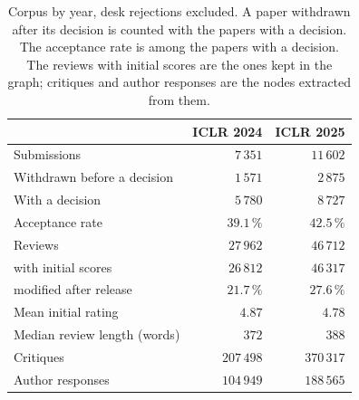 \begin{table}[t]
\centering
\small
\setlength{\tabcolsep}{4pt}
\caption{Corpus by year, desk rejections excluded. A paper withdrawn after its decision is counted with the papers with a decision. The acceptance rate is among the papers with a decision. The reviews with initial scores are the ones kept in the graph; critiques and author responses are the nodes extracted from them.}
\label{tab:dataset}
\begin{tabular}{@{}lrr@{}}
\toprule
 & ICLR 2024 & ICLR 2025 \\
\midrule
Submissions & $7\,351$ & $11\,602$ \\
Withdrawn before a decision & $1\,571$ & $2\,875$ \\
With a decision & $5\,780$ & $8\,727$ \\
Acceptance rate & $39.1\,\%$ & $42.5\,\%$ \\
Reviews & $27\,962$ & $46\,712$ \\
\quad with initial scores & $26\,812$ & $46\,317$ \\
\quad modified after release & $21.7\,\%$ & $27.6\,\%$ \\
Mean initial rating & $4.87$ & $4.78$ \\
Median review length (words) & $372$ & $388$ \\
\midrule
Critiques & $207\,498$ & $370\,317$ \\
Author responses & $104\,949$ & $188\,565$ \\
\bottomrule
\end{tabular}
\end{table}
